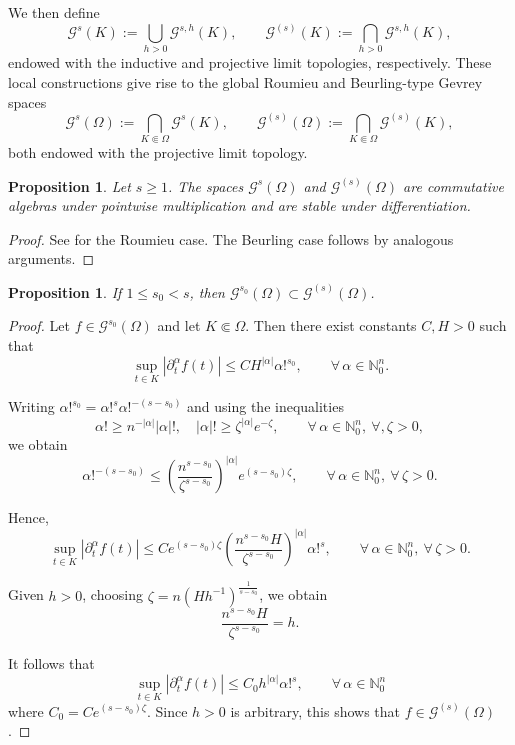 \documentclass[11pt,reqno]{amsart}
\numberwithin{equation}{section}
\newtheorem{proposition}[theorem]{Proposition}
\begin{document}
	We then define
	\[
	\mathscr{G}^s(K) := \bigcup_{h > 0} \mathscr{G}^{s,h}(K), 
	\qquad 
	\mathscr{G}^{(s)}(K) := \bigcap_{h > 0} \mathscr{G}^{s,h}(K),
	\]
	endowed with the inductive and projective limit topologies, respectively. These local constructions give rise to the global Roumieu and Beurling-type Gevrey spaces
	\[
	\mathscr{G}^s(\Omega) := \bigcap_{K \Subset \Omega} \mathscr{G}^s(K), 
	\qquad 
	\mathscr{G}^{(s)}(\Omega) := \bigcap_{K \Subset \Omega} \mathscr{G}^{(s)}(K),
	\]
	both endowed with the projective limit topology.
	
	\begin{proposition}
		Let $s \geq 1$. The spaces $\mathscr{G}^s(\Omega)$ and $\mathscr{G}^{(s)}(\Omega)$ are commutative algebras under pointwise multiplication and are stable under differentiation.
	\end{proposition}
	
	\begin{proof}
		See \cite[Proposition~1.4.5]{Rod_Gevrey} for the Roumieu case. The Beurling case follows by analogous arguments.
	\end{proof}
	
	\begin{proposition}
		If $1 \leq s_0 < s$, then $
		\mathscr{G}^{s_0}(\Omega) \subset \mathscr{G}^{(s)}(\Omega)$.
	\end{proposition}
	
	\begin{proof}
		Let $f \in \mathscr{G}^{s_0}(\Omega)$ and let $K \Subset \Omega$. Then there exist constants $C,H>0$ such that
		\[
		\sup_{t \in K} |\partial_t^\alpha f(t)| \leq C H^{|\alpha|}\alpha!^{s_0},
		\qquad \forall\, \alpha \in \mathbb{N}_0^n.
		\]
		
		Writing $\alpha!^{s_0} = \alpha!^s \alpha!^{-(s-s_0)}$ and using the inequalities
		\[
		\alpha! \geq n^{-|\alpha|}|\alpha|!, 
		\quad 
		|\alpha|! \geq \zeta^{|\alpha|} e^{-\zeta}, \qquad \forall\,\alpha\in\mathbb{N}_0^n,\ \forall,\zeta>0,
		\]
		we obtain
		\[
		\alpha!^{-(s-s_0)} \leq \left(\frac{n^{s-s_0}}{\zeta^{s-s_0}}\right)^{|\alpha|} e^{(s-s_0)\zeta},
		\qquad \forall\,\alpha\in\mathbb{N}_0^n,\ \forall\, \zeta>0.
		\]
		
		Hence,
		\[
		\sup_{t \in K} |\partial_t^\alpha f(t)|
		\leq C e^{(s-s_0)\zeta}
		\left(\frac{n^{s-s_0}H}{\zeta^{s-s_0}}\right)^{|\alpha|} \alpha!^s,\qquad\forall\,\alpha\in\mathbb{N}_0^n,\ \forall\,\zeta>0.
		\]
		
		Given $h>0$, choosing $
		\zeta = n(Hh^{-1})^{\frac{1}{s-s_0}}$, we obtain
		\[
		\frac{n^{s-s_0}H}{\zeta^{s-s_0}} = h.
		\]
		
		It follows that
		\[
		\sup_{t \in K} |\partial_t^\alpha f(t)| \leq C_0 h^{|\alpha|}\alpha!^s,\qquad\forall\,\alpha\in\mathbb{N}_0^n
		\]
		where $C_0 = C e^{(s-s_0)\zeta}$. Since $h>0$ is arbitrary, this shows that
		$f \in \mathscr{G}^{(s)}(\Omega)$.
	\end{proof}
	
\end{document}
